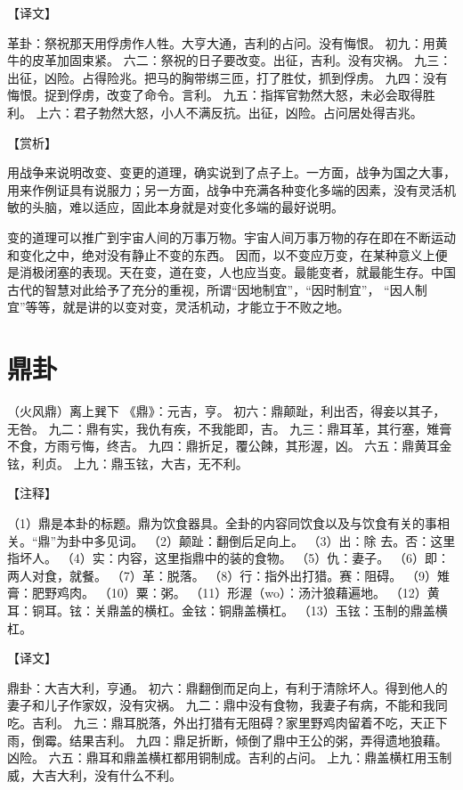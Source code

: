 \documentclass[12pt,UTF8]{ctexbook}
\begin{document}
【译文】

革卦：祭祝那天用俘虏作人牲。大亨大通，吉利的占问。没有悔恨。
初九：用黄牛的皮革加固束紧。
六二：祭祝的日子要改变。出征，吉利。没有灾祸。
九三：出征，凶险。占得险兆。把马的胸带绑三匝，打了胜仗，抓到俘虏。
九四：没有悔恨。捉到俘虏，改变了命令。言利。
九五：指挥官勃然大怒，未必会取得胜利。
上六：君子勃然大怒，小人不满反抗。出征，凶险。占问居处得吉兆。

【赏析】

用战争来说明改变、变更的道理，确实说到了点子上。一方面，战争为国之大事，用来作例证具有说服力；另一方面，战争中充满各种变化多端的因素，没有灵活机敏的头脑，难以适应，固此本身就是对变化多端的最好说明。

变的道理可以推广到宇宙人间的万事万物。宇宙人间万事万物的存在即在不断运动和变化之中，绝对没有静止不变的东西。 因而，以不变应万变，在某种意义上便是消极闭塞的表现。天在变，道在变，人也应当变。最能变者，就最能生存。中国古代的智慧对此给予了充分的重视，所谓“因地制宜”，“因时制宜”， “因人制宜”等等，就是讲的以变对变，灵活机动，才能立于不败之地。

\chapter{鼎卦}

（火风鼎）离上巽下
《鼎》：元吉，亨。
初六：鼎颠趾，利出否，得妾以其子，无咎。
九二：鼎有实，我仇有疾，不我能即，吉。
九三：鼎耳革，其行塞，雉膏不食，方雨亏悔，终吉。
九四：鼎折足，覆公餗，其形渥，凶。
六五：鼎黄耳金铉，利贞。
上九：鼎玉铉，大吉，无不利。

【注释】

（1）鼎是本卦的标题。鼎为饮食器具。全卦的内容同饮食以及与饮食有关的事相关。“鼎”为卦中多见词。
（2）颠趾：翻倒后足向上。
（3）出：除 去。否：这里指坏人。
（4）实：内容，这里指鼎中的装的食物。
（5）仇：妻子。
（6）即：两人对食，就餐。
（7）革：脱落。
（8）行：指外出打猎。赛：阻碍。
（9）雉膏：肥野鸡肉。
（10）粟：粥。
（11）形渥（wo）：汤汁狼藉遍地。
（12）黄耳：铜耳。铉：关鼎盖的横杠。金铉：铜鼎盖横杠。
（13）玉铉：玉制的鼎盖横杠。

【译文】

鼎卦：大吉大利，亨通。
初六：鼎翻倒而足向上，有利于清除坏人。得到他人的妻子和儿子作家奴，没有灾祸。
九二：鼎中没有食物，我妻子有病，不能和我同吃。吉利。
九三：鼎耳脱落，外出打猎有无阻碍？家里野鸡肉留着不吃，天正下雨，倒霉。结果吉利。
九四：鼎足折断，倾倒了鼎中王公的粥，弄得遗地狼藉。凶险。
六五：鼎耳和鼎盖横杠都用铜制成。吉利的占问。
上九：鼎盖横杠用玉制威，大吉大利，没有什么不利。
\end{document}
